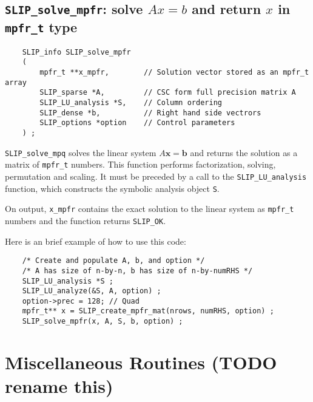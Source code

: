 \documentclass[12pt]{article}
\theoremstyle{definition}
\begin{document}
\cprotect\subsection{\verb|SLIP_solve_mpfr|: solve $Ax=b$ and return $x$ in \verb|mpfr_t| type}
\label{ss:SLIP_solve_mpfr}

\begin{mdframed}[userdefinedwidth=6in]
{\footnotesize
\begin{verbatim}
    SLIP_info SLIP_solve_mpfr
    (
        mpfr_t **x_mpfr,        // Solution vector stored as an mpfr_t array
        SLIP_sparse *A,         // CSC form full precision matrix A
        SLIP_LU_analysis *S,    // Column ordering
        SLIP_dense *b,          // Right hand side vectrors
        SLIP_options *option    // Control parameters
    ) ;
\end{verbatim}
} \end{mdframed}

\verb|SLIP_solve_mpq| solves the linear system $A\mathbf{x}=\mathbf{b}$ and
returns the solution as a matrix of \verb|mpfr_t| numbers. This function
performs factorization, solving, permutation and scaling.  It must be preceded
by a call to the \verb|SLIP_LU_analysis| function, which constructs the
symbolic analysis object \verb|S|.

On output, \verb|x_mpfr| contains the exact solution to the linear system
as \verb|mpfr_t| numbers and the function returns \verb|SLIP_OK|.

Here is an brief example of how to use this code:

{\small
\begin{verbatim}
    /* Create and populate A, b, and option */
    /* A has size of n-by-n, b has size of n-by-numRHS */
    SLIP_LU_analysis *S ;
    SLIP_LU_analyze(&S, A, option) ;
    option->prec = 128; // Quad
    mpfr_t** x = SLIP_create_mpfr_mat(nrows, numRHS, option) ;
    SLIP_solve_mpfr(x, A, S, b, option) ; \end{verbatim} }

\section{Miscellaneous Routines (TODO rename this)}
\label{s:miscellaneous_routine}
\end{document}
